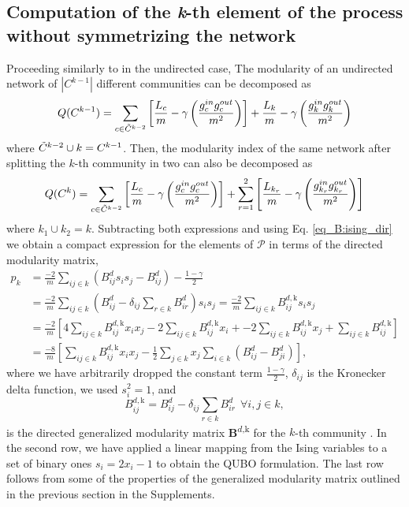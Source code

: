 \documentclass[pdflatex,sn-mathphys-num]{sn-jnl}%
\begin{document}
\subsection{Computation of the \textit{k}-th element of the process without symmetrizing the network}
Proceeding similarly to in the undirected case, The modularity of an undirected network of $|C^{k-1}|$ different communities can be decomposed as 
$$ Q(C^{k-1}) = \sum_{c \in \Tilde{C}^{k-2}} \left[ \frac{L_c}{m} - \gamma \left(\frac{g^{in}_c g^{out}_c}{m^2}\right)\right] + \frac{L_k}{m} - \gamma \left(\frac{g^{in}_k g^{out}_k}{m^2}\right) $$ where $\Tilde{C}^{k-2} \cup k = C^{k-1}$. Then, the modularity index of the same network after splitting the $k$-th community in two can also be decomposed as
$$ Q(C^{k}) = \sum_{c \in \Tilde{C}^{k-2}} \left[ \frac{L_c}{m} - \gamma \left(\frac{g^{in}_c g^{out}_c}{m^2}\right)\right] + \sum_{r=1}^{2} \left[ \frac{L_{k_{r}}}{m} - \gamma \left(\frac{g^{in}_{k_{r}} g^{out}_{k_{r}}}{m^2}\right) \right]$$ where $k_1 \cup k_2 = k$. Subtracting both expressions and using Eq. \ref{eq_B:ising_dir} we obtain a compact expression for the elements of $\mathcal{P}$ in terms of the directed modularity matrix,
\begin{equation} \label{eq_B:pk_dir}
    \begin{split}
        p_k &= \frac{-2}{m} \sum_{ij \in k} \left( B_{ij}^ds_i s_j - B^d_{ij}\right) - \frac{1-\gamma}{2} \\
        &= \frac{-2}{m} \sum_{ij \in k} \left( B^d_{ij} - \delta_{ij} \sum_{r\in k} B^d_{ir}\right)s_i s_j = \frac{-2}{m} \sum_{ij \in k} B_{ij}^{d,\text{k}} s_i s_j \\
        &= \frac{-2}{m} \left[ 4 \sum_{ij \in k} B_{ij}^{d,\text{k}} x_i x_j -2 \sum_{ij \in k} B_{ij}^{d,\text{k}} x_i + -2 \sum_{ij \in k} B_{ij}^{d,\text{k}} x_j + \sum_{ij \in k} B_{ij}^{d,\text{k}} \right]\\
        &= \frac{-8}{m} \left[ \sum_{ij \in k} B_{ij}^{d,\text{k}} x_i x_j  - \frac{1}{2} \sum_{j\in k} x_j \sum_{i\in k} \left(B_{ij}^d - B_{ji}^d \right)\right],
    \end{split}
\end{equation} where we have arbitrarily dropped the constant term $\frac{1-\gamma}{2}$, $\delta_{ij}$ is the Kronecker delta function, we used $s_i^2=1$, and 
\begin{equation} \label{eq_B:dir_gen_mod_matrix}
    B_{ij}^{d,\text{k}} = B_{ij}^d - \delta_{ij} \sum_{r\in k} B_{ir}^d \ \ \forall i,j \in k,
\end{equation}is the directed generalized modularity matrix \textbf{B}\textsuperscript{$d$,k} for the $k$-th community \cite{Newman2006}. In the second row, we have applied a linear mapping from the Ising variables to a set of binary ones $s_i=2x_i-1$ to obtain the QUBO formulation. The last row follows from some of the properties of the generalized modularity matrix outlined in the previous section in the Supplements.
\end{document}
